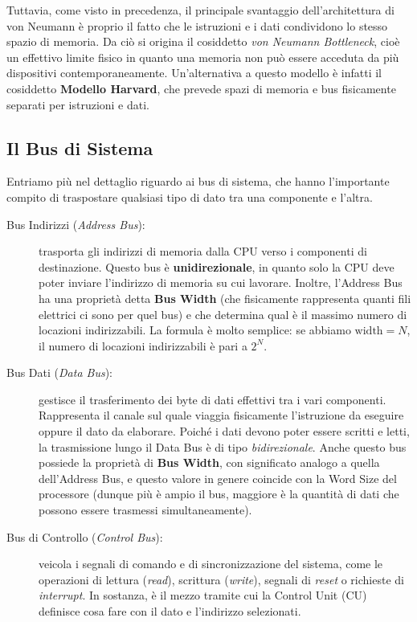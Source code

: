 \documentclass[12pt]{report}
\begin{document}
	Tuttavia, come visto in precedenza, il principale svantaggio dell'architettura di von Neumann è proprio il fatto che le istruzioni e i dati condividono lo stesso spazio di memoria. Da ciò si origina il cosiddetto \textit{von Neumann Bottleneck}, cioè un effettivo limite fisico in quanto una memoria non può essere acceduta da più dispositivi contemporaneamente. Un'alternativa a questo modello è infatti il cosiddetto \textbf{Modello Harvard}, che prevede spazi di memoria e bus fisicamente separati per istruzioni e dati.
	
	\subsection{Il Bus di Sistema}
	Entriamo più nel dettaglio riguardo ai bus di sistema, che hanno l'importante compito di traspostare qualsiasi tipo di dato tra una componente e l'altra.
	
	\begin{description}
		\item [Bus Indirizzi (\textit{Address Bus}):] trasporta gli indirizzi di memoria dalla CPU verso i componenti di destinazione.
		Questo bus è \textbf{unidirezionale}, in quanto solo la CPU deve poter inviare l'indirizzo di memoria su cui lavorare.
		Inoltre, l'Address Bus ha una proprietà detta \textbf{Bus Width} (che fisicamente rappresenta quanti fili elettrici ci sono per quel bus) e che determina qual è il massimo numero di locazioni indirizzabili. La formula è molto semplice: se abbiamo $\text{width}=N$, il numero di locazioni indirizzabili è pari a $2^N$.
		
		\item [Bus Dati (\textit{Data Bus}):] gestisce il trasferimento dei byte di dati effettivi tra i vari componenti. Rappresenta il canale sul quale viaggia fisicamente l'istruzione da eseguire oppure il dato da elaborare. Poiché i dati devono poter essere scritti e letti, la trasmissione lungo il Data Bus è di tipo \textit{bidirezionale}. Anche questo bus possiede la proprietà di \textbf{Bus Width}, con significato analogo a quella dell'Address Bus, e questo valore in genere coincide con la Word Size del processore (dunque più è ampio il bus, maggiore è la quantità di dati che possono essere trasmessi simultaneamente).
		
		\item [Bus di Controllo (\textit{Control Bus}):] veicola i segnali di comando e di sincronizzazione del sistema, come le operazioni di lettura (\textit{read}), scrittura (\textit{write}), segnali di \textit{reset} o richieste di \textit{interrupt}. In sostanza, è il mezzo tramite cui la Control Unit (CU) definisce cosa fare con il dato e l'indirizzo selezionati.
	\end{description}
	
\end{document}
